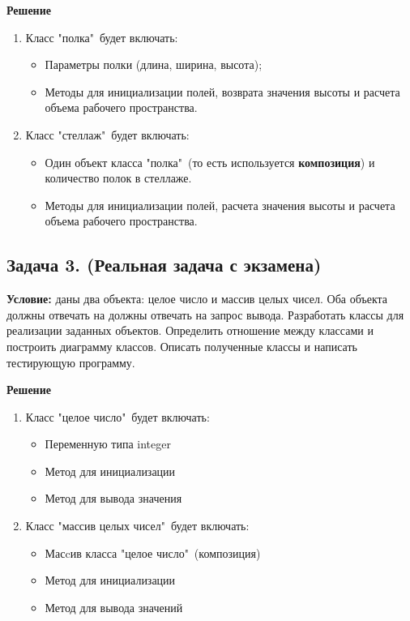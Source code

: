 {\bf Решение}

\begin{enumerate}
\item Класс "полка"\ будет включать:
\begin{itemize}
    \item Параметры полки (длина, ширина, высота);
    \item Методы для инициализации полей, возврата значения высоты и расчета объема рабочего пространства. 
\end{itemize}

\item Класс "стеллаж"\ будет включать:
\begin{itemize} 
    \item Один объект класса "полка"\ (то есть используется {\bf композиция}) 
    и количество полок в стеллаже. 
    \item Методы для инициализации полей, расчета значения высоты и расчета объема рабочего пространства. 
\end{itemize}
\end{enumerate}

{}



{}



\newpage\subsection{Задача 3. (Реальная задача с экзамена)}
{\bf Условие:} даны два объекта: целое число и массив целых чисел. Оба объекта должны отвечать на должны отвечать на запрос вывода. Разработать классы для реализации заданных объектов. Определить отношение между классами и построить диаграмму классов. Описать полученные классы и написать тестирующую программу. 


{\bf Решение}

\begin{enumerate}
\item Класс "целое число"\ будет включать:
\begin{itemize}
    \item Переменную типа integer
    \item Метод для инициализации
    \item Метод для вывода значения
\end{itemize}

\item Класс "массив целых чисел"\ будет включать:
\begin{itemize}
    \item Масcив класса "целое число"\ (композиция)
    \item Метод для инициализации
    \item Метод для вывода значений
\end{itemize}
\end{enumerate}

